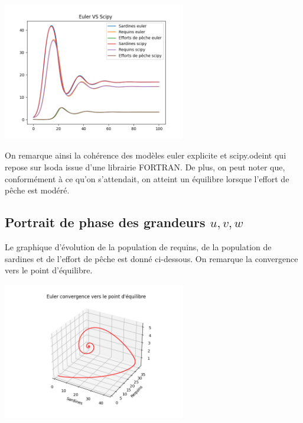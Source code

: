 \documentclass[a4paper, 11pt]{report}%
\begin{document}
        \begin{center}
            \includegraphics[width=8cm]{figures/Euler_VS_Scipy_good_conditions.png}
        \end{center}
        On remarque ainsi la cohérence des modèles euler explicite et scipy.odeint qui repose sur lsoda issue d'une librairie FORTRAN.
        De plus, on peut noter que, conformément à ce qu'on s'attendait, on atteint un équilibre lorsque l'effort de pêche est modéré. 
        \subsection{Portrait de phase des grandeurs $u,v,w$}
        Le graphique d'évolution de la population de requins, de la population de sardines et de l'effort de pêche est donné ci-dessous.
        On remarque la convergence vers le point d'équilibre.
        \begin{center}
            \includegraphics[width=8cm]{figures/convergence_3d_point_equilibre.png}
        \end{center}
        
\end{document}
